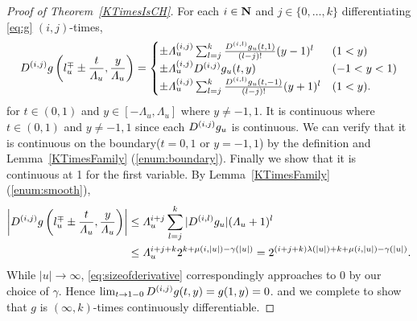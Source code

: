 \begin{proof}[Proof of Theorem~\ref{KTimesIsCH}]
For each $i \in \mathbf N$ and $j \in \{0, \dots, k\}$ differentiating \eqref{eq:g} $(i,j)$-times,
\begin{equation}
   D^{(i, j)}g \left(l^\mp_u \pm \frac{t}{\varLambda_u}, \frac{y}{\varLambda_u}\right)
   = \begin{cases}
      \pm \varLambda_u^{(i, j)} \sum^{k}_{l=j} \frac{D^{(i,l)} g_u(t,1)}{(l-j)!}
      (y - 1)^l &  (1<y)
      \\
      \pm \varLambda_u^{(i,j)} D^{(i, j)} g_u(t, y) & (-1 < y < 1)
      \\
      \pm \varLambda_u^{(i, j)} \sum^{k}_{l=j} 
      \frac{D^{(i,l)} g_u(t, -1)}{(l-j)!} (y + 1)^l &  (1<y).
    \end{cases}
\end{equation}
for $t \in (0, 1)$ and $y \in [-\Lambda_u, \Lambda_u]$ where $y \neq -1, 1$.
It is continuous where $t \in (0,1)$ and $y \not = -1, 1$
since each $D^{(i,j)}g_u$ is continuous.
We can verify that it is continuous on the boundary($t = 0, 1$ or $y = -1, 1$)
by the definition and Lemma~\ref{KTimesFamily} (\ref{enum:boundary}).
Finally we show that it is continuous at 1 for the first variable.
By Lemma~\ref{KTimesFamily} (\ref{enum:smooth}),
 \begin{align}
  \left|D^{(i, j)}g \left(l^\mp_u \pm \frac{t}{\varLambda_u},
  \frac{y}{\varLambda_u}\right)\right|
  &\le 
  \varLambda_u^{i+j} \sum^{k}_{l=j} |D^{(i,l)} g_u | (\varLambda_u + 1)^l 
  \notag
  \\
  & \le \varLambda_u^{i+j+k}  2^{k + \mu(i, |u|) - \gamma(|u|)}
   =  2^{(i+j+k)\lambda(|u|) + k + \mu(i, |u|)  - \gamma(|u|)}. 
  \label{eq:sizeofderivative}
 \end{align}
While $|u| \to \infty$, \eqref{eq:sizeofderivative} correspondingly approaches to $0$ by our choice of $\gamma$.
Hence $\lim_{t \to 1-0}D^{(i,j)} g(t,y) = g(1, y) = 0$.
and we complete to show that $g$ is $(\infty, k)$-times continuously differentiable.
\end{proof}


